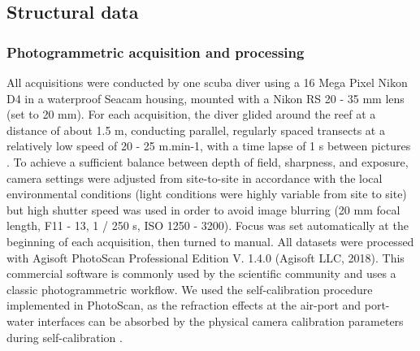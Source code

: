 \newpage

\subsection{Structural data}\label{chapitre4_2.2}

\subsubsection{Photogrammetric acquisition and processing}\label{chapitre4_2.1.1}
All acquisitions were conducted by one scuba diver using a 16 Mega Pixel Nikon D4 in a waterproof Seacam housing, mounted with a Nikon RS 20 - 35 mm lens (set to 20 mm). For each acquisition, the diver glided around the reef at a distance of about 1.5 m, conducting parallel, regularly spaced transects at a relatively low speed of 20 - 25 m.min-1, with a time lapse of 1 s between pictures \citep{marre_monitoring_2019}. To achieve a sufficient balance between depth of field, sharpness, and exposure, camera settings were adjusted from site-to-site in accordance with the local environmental conditions (light conditions were highly variable from site to site) but high shutter speed was used in order to avoid image blurring (20 mm focal length, F11 - 13, 1 / 250 s, ISO 1250 - 3200). Focus was set automatically at the beginning of each acquisition, then turned to manual.
All datasets were processed with Agisoft PhotoScan Professional Edition V. 1.4.0 (Agisoft LLC, 2018). This commercial software is commonly used by the scientific community \citep{burns_assessing_2016, casella_mapping_2017, figueira_accuracy_2015, guo_accuracy_2016, mizuno_simple_2017} and uses a classic photogrammetric workflow. We used the self-calibration procedure implemented in PhotoScan, as the refraction effects at the air-port and port-water interfaces can be absorbed by the physical camera calibration parameters during self-calibration \citep{shortis_calibration_2015}.

